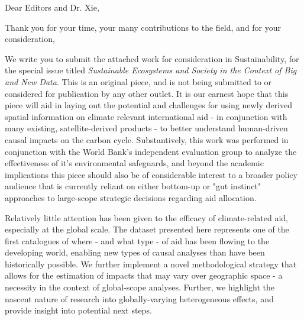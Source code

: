 \documentclass[11pt,a4paper,roman]{moderncv}        %
\begin{document}
\date{\today}
\opening{Dear Editors and Dr. Xie,}
\closing{Thank you for your time, your many contributions to the field, and for your consideration,}
\makelettertitle

We write you to submit the attached work for consideration in Sustainability, for the special issue titled \textit{Sustainable Ecosystems and Society in the Context of Big and New Data}.  This is an original piece, and is not being submitted to or considered for publication by any other outlet.  It is our earnest hope that this piece will aid in laying out the potential and challenges for using newly derived spatial information on climate relevant international aid - in conjunction with many existing, satellite-derived products - to better understand human-driven causal impacts on the carbon cycle.  Substantively, this work was performed in conjunction with the World Bank's independent evaluation group to analyze the effectiveness of it's environmental safeguards, and beyond the academic implications this piece should also be of considerable interest to a broader policy audience that is currently reliant on either bottom-up or "gut instinct" approaches to large-scope strategic decisions regarding aid allocation.\\
\vspace{4 mm}

Relatively little attention has been given to the efficacy of climate-related aid, especially at the global scale.  The dataset presented here represents one of the first catalogues of where - and what type - of aid has been flowing to the developing world, enabling new types of causal analyses than have been historically possible.  We further implement a novel methodological strategy that allows for the estimation of impacts that may vary over geographic space - a necessity in the context of global-scope analyses.  Further, we highlight the nascent nature of research into globally-varying heterogeneous effects, and provide insight into potential next steps.
\vspace{4 mm}


\makeletterclosing
\end{document}
